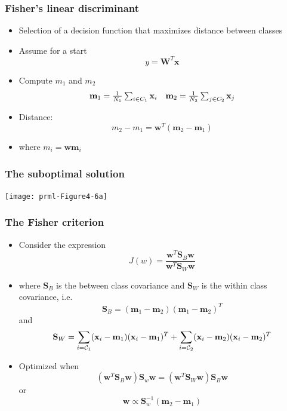 \documentclass[10pt]{beamer}
\begin{document}
\begin{frame}
  \frametitle{Fisher's linear discriminant}
  \begin{itemize}
  \item Selection of a decision function that maximizes distance
    between classes
  \item Assume for a start
    \[
    y = {\mathbf W}^T {\mathbf x}
    \]
  \item Compute $m_1$ and $m_2$
    \[
    \begin{array}[c]{cc}
      {\mathbf m}_1 = \frac{1}{N_1}\sum_{i\in C_1} {\mathbf x}_i &
      {\mathbf m}_2 = \frac{1}{N_2}\sum_{j\in C_2} {\mathbf x}_j
    \end{array}
    \]
  \item Distance:
    \[
    m_2 - m_1 = {\mathbf w}^T \left( {\mathbf m}_2 - {\mathbf m}_1
    \right)
    \]
  \item where $m_i = {\mathbf w} {\mathbf m}_i$
  \end{itemize}
\end{frame}

\begin{frame}
  \frametitle{The suboptimal solution}
  \begin{center}
    \texttt{[image: prml-Figure4-6a]}
  \end{center}
\end{frame}

\begin{frame}
  \frametitle{The Fisher criterion}
  \begin{itemize}
  \item Consider the expression
    \[
    J(w) = \frac{{\mathbf w}^T {\mathbf S}_B {\mathbf w}}{{\mathbf
        w}^T {\mathbf S}_W {\mathbf w}}
    \]
  \item where ${\mathbf S}_B$ is the between class covariance and
    ${\mathbf S}_W$ is the within class covariance, i.e.
    \[ 
    {\mathbf S}_B = ( {\mathbf m}_1 - {\mathbf m}_2 )( {\mathbf m}_1 -
    {\mathbf m}_2 )^T
    \]
    and
    \[
    {\mathbf S}_W = \sum_{i={\cal C}_1}
    ({\mathbf x}_i - {\mathbf m}_1)({\mathbf x}_i - {\mathbf m}_1)^T
    + \sum_{i={\cal C}_2}
    ({\mathbf x}_i - {\mathbf m}_2)({\mathbf x}_i - {\mathbf m}_2)^T
    \]
  \item Optimized when
    \[
    ({\mathbf w}^T {\mathbf S}_B {\mathbf w}) {\mathbf S}_w {\mathbf
      w} = ({\mathbf w}^T {\mathbf S}_W {\mathbf w}) {\mathbf S}_B
    {\mathbf w}
    \] 
    or
    \[
    {\mathbf w} \propto {\mathbf S}_w^{-1} ({\mathbf m}_2 - {\mathbf
      m}_1)
    \]
  \end{itemize}
\end{frame}
\end{document}
